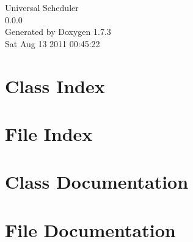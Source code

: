 \documentclass[a4paper]{book}
\begin{document}
\hypersetup{pageanchor=false}
\begin{titlepage}
\vspace*{7cm}
\begin{center}
{\Large Universal Scheduler \\[1ex]\large 0.0.0 }\\
\vspace*{1cm}
{\large Generated by Doxygen 1.7.3}\\
\vspace*{0.5cm}
{\small Sat Aug 13 2011 00:45:22}\\
\end{center}
\end{titlepage}
\clearemptydoublepage
{}
\tableofcontents
\clearemptydoublepage
{}
\hypersetup{pageanchor=true}
\chapter{Class Index}

\chapter{File Index}

\chapter{Class Documentation}






\chapter{File Documentation}












\printindex
\end{document}
